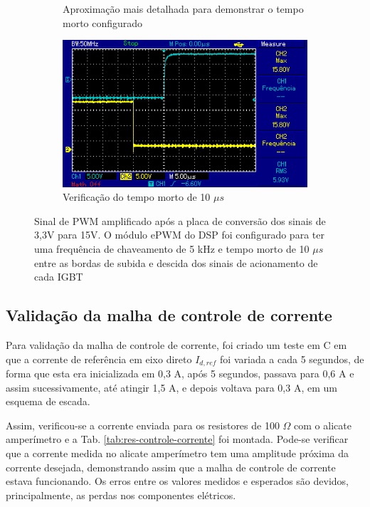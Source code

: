 \begin{figure}[!hbt]
\begin{subfigure}[b]{0.49\textwidth}
		\caption{Aproximação mais detalhada para demonstrar o tempo morto configurado}
	\end{subfigure}
	\begin{subfigure}[b]{0.49\textwidth}
		\centering
		\includegraphics[width=\textwidth]{figuras/resultados_tempo_morto2.png}
		\caption{Verificação do tempo morto de 10 $\mu s$}
	\end{subfigure}
	\caption{Sinal de PWM amplificado após a placa de conversão dos sinais de 3,3V para 15V. O módulo ePWM do DSP foi configurado para ter uma frequência de chaveamento de 5 kHz e tempo morto de 10 $\mu s$ entre as bordas de subida e descida dos sinais de acionamento de cada IGBT}
    \label{fig:res-pwm}
\end{figure}

\subsection{Validação da malha de controle de corrente}

Para validação da malha de controle de corrente, foi criado um teste em C em que a corrente de referência em eixo direto $I_{d,ref}$ 
foi variada a cada 5 segundos, de forma que esta era inicializada em 0,3 A, após 5 segundos, passava para 0,6 A e assim sucessivamente,
até atingir 1,5 A, e depois voltava para 0,3 A, em um esquema de escada.

Assim, verificou-se a corrente enviada para os resistores de 100 $\Omega$ com o alicate amperímetro e a Tab. \ref{tab:res-controle-corrente} foi montada.
Pode-se verificar que a corrente medida no alicate amperímetro tem uma amplitude próxima da corrente desejada, demonstrando assim que a malha de controle de corrente
estava funcionando. Os erros entre os valores medidos e esperados são devidos, principalmente, as perdas nos componentes elétricos.

